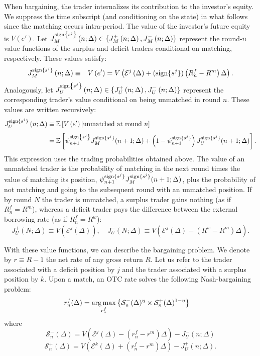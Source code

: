 \documentclass[12pt,american,english,notitlepage]{article}
\begin{document}
When bargaining, the trader internalizes its contribution to the investor's equity.
We suppress the time subscript (and conditioning on the state) in
what follows since the matching occurs intra-period. The value of
the investor's future equity is $V\left(e'\right)$. Let $J_{M}^{\text{sign}\left\{ s^{j}\right\} }\left(n;\Delta\right)\in\{J_{M}^{+}\left(n;\Delta\right),J_{M}^{-}\left(n;\Delta\right)\}$
represent the round-$n$ value functions of the surplus and deficit
traders conditional on matching, respectively. These values satisfy:
\begin{eqnarray*}
J_{M}^{\text{sign}\{s^{j}\}}\left(n;\Delta\right) & \equiv & V\left(e'\right)=V\left(\mathcal{E}^{j}\left(\Delta\right)+(\text{sign}\{s^{j}\})\left(R_{n}^{f}-R^{m}\right)\Delta\right).
\end{eqnarray*}
Analogously, let $J_{U}^{\text{sign}\left\{ s^{j}\right\} }\left(n;\Delta\right)\in\{J_{U}^{+}\left(n;\Delta\right),J_{U}^{-}\left(n;\Delta\right)\}$
represent the corresponding trader's value conditional on being
unmatched in round $n$. These values are written recursively:
\begin{align*}
J_{U}^{\text{sign}\{s^{j}\}}\left(n;\Delta\right) & \equiv\mathbb{E}\left[V\left(e'\right)|\text{unmatched at round $n$}\right]\\[3pt]
 & =\mathbb{E}\left[\psi_{n+1}^{\text{sign}\left\{ s^{j}\right\} }J_{M}^{\text{sign}\{s^{j}\}}(n+1;\Delta)+\left(1-\psi_{n+1}^{\text{sign}\{s^{j}\}}\right)J_{U}^{\text{sign}\{s^{j}\}}(n+1;\Delta)\right].
\end{align*}
This expression uses the trading probabilities obtained above. The value of an unmatched trader is the probability of matching in the
next round times the value of matching its position, $\psi_{n+1}^{\text{sign}\{s^{j}\}}J_{M}^{\text{sign}\{s^{j}\}}(n+1;\Delta)$, plus the probability of not matching and going to the subsequent round
with an unmatched position. If by round $N$ the trader is unmatched,
a surplus trader gains nothing (as if $R_{n}^{f}=R^{m}$), whereas a deficit trader pays the difference between the external borrowing rate (as
if $R_{n}^{f}=R^{w}$):
\[
J_{U}^{+}(N;\Delta)\equiv V\left(\mathcal{E}^{j}\left(\Delta\right)\right),\quad J_{U}^{-}(N;\Delta)\equiv V\left(\mathcal{E}^{j}\left(\Delta\right)-\left(R^{w}-R^{m}\right)\Delta\right).
\]

With these value functions, we can describe the bargaining problem. We denote by $r\equiv R-1$  the net rate of any gross return $R$. Let us refer to the trader associated with a deficit position by $j$ and the trader associated with a surplus position by $k$. Upon
a match, an OTC rate solves the following Nash-bargaining problem:
\begin{align}
r_{n}^{f}(\Delta) & =\operatorname*{arg\,max}_{r^f_{n}}\left\{ \mathcal{S}_{n}^{-}(\Delta)^{\eta} \times \mathcal{S}_{n}^{+}(\Delta)^{1-\eta}\right\} \label{eq:BargainProb}
\end{align}\vspace{-5pt}
where $$ \mathcal{S}_{n}^{-}({\Delta})  =V\left(\mathcal{E}^{j}\left(\Delta\right)-\left(r_{n}^{f}-r^{m}\right)\Delta\right)-J_{U}^{-}(n;\Delta)  $$ $$
 \mathcal{S}_{n}^{+}(\Delta) =V\left(\mathcal{E}^{k}\left(\Delta\right)+\left(r_{n}^{f}-r^{m}\right)\Delta\right)-J_{U}^{+}(n;\Delta). $$
\end{document}
